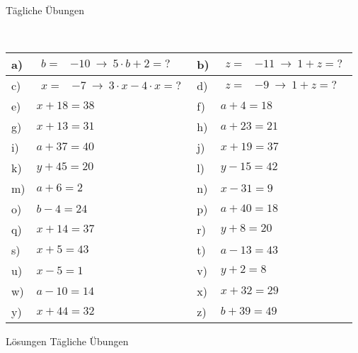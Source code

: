 \documentclass[12pt]{article}
\begin{document}
\centerline{{\Large Tägliche Übungen}} 
\vspace{1cm}
\noindent \\


\begin{xltabular}{\textwidth}{|C{0.75cm}|X|C{0.75cm}|X|}
\hline
a)&$\begin{aligned}
 b=&-10~ \rightarrow ~ 5 \cdot b + 2=?
\end{aligned}$
&
b)&$\begin{aligned}
 z=&-11~ \rightarrow ~ 1 + z=?
\end{aligned}$
\\\hline
c)&$\begin{aligned}
 x=&-7~ \rightarrow ~ 3 \cdot x - 4 \cdot x=?
\end{aligned}$
&
d)&$\begin{aligned}
 z=&-9~ \rightarrow ~ 1 + z=?
\end{aligned}$
\\\hline
e)&$x+18 = 38$
&
f)&$a+4 = 18$
\\\hline
g)&$x+13 = 31$
&
h)&$a+23 = 21$
\\\hline
i)&$a+37 = 40$
&
j)&$x+19 = 37$
\\\hline
k)&$y+45 = 20$
&
l)&$y-15 = 42$
\\\hline
m)&$a+6 = 2$
&
n)&$x-31 = 9$
\\\hline
o)&$b-4 = 24$
&
p)&$a+40 = 18$
\\\hline
q)&$x+14 = 37$
&
r)&$y+8 = 20$
\\\hline
s)&$x+5 = 43$
&
t)&$a-13 = 43$
\\\hline
u)&$x-5 = 1$
&
v)&$y+2 = 8$
\\\hline
w)&$a-10 = 14$
&
x)&$x+32 = 29$
\\\hline
y)&$x+44 = 32$
&
z)&$b+39 = 49$
\\\hline
\end{xltabular}
\vspace{0.5cm}
\newpage
{}
\centerline{{\large Lösungen Tägliche Übungen}} 
\vspace{0.5cm}
\end{document}
